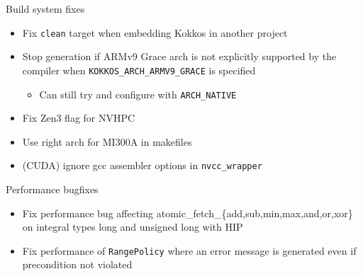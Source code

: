 \begin{frame}[fragile]{Build system fixes}
  \begin{itemize}
      \item Fix \texttt{clean} target when embedding Kokkos in another project
      \item Stop generation if ARMv9 Grace arch is not explicitly supported by the compiler when \texttt{KOKKOS\_ARCH\_ARMV9\_GRACE} is specified
      \begin{itemize}
        \item Can still try and configure with \texttt{ARCH\_NATIVE}
      \end{itemize}
      \item Fix Zen3 flag for NVHPC
      \item Use right arch for MI300A in makefiles
      \item (CUDA) ignore gcc assembler options in \texttt{nvcc_wrapper}
  \end{itemize}
 \end{frame}

\begin{frame}[fragile]{Performance bugfixes}
 \begin{itemize}
     \item Fix performance bug affecting atomic\_fetch\_\{add,sub,min,max,and,or,xor\} on integral types long and unsigned long with HIP
     \item Fix performance of \texttt{RangePolicy} where an error message is generated even if precondition not violated
 \end{itemize}
\end{frame}




